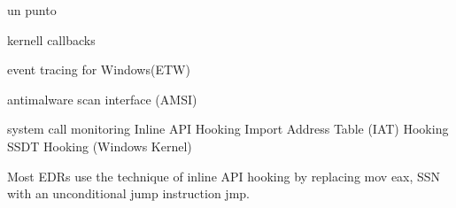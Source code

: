 un punto 

kernell callbacks

event tracing for Windows(ETW)

antimalware scan interface (AMSI)

system call monitoring
    Inline API Hooking
    Import Address Table (IAT) Hooking
    SSDT Hooking (Windows Kernel)

    Most EDRs use the technique of inline API hooking by replacing mov eax, SSN with an unconditional jump instruction jmp.
